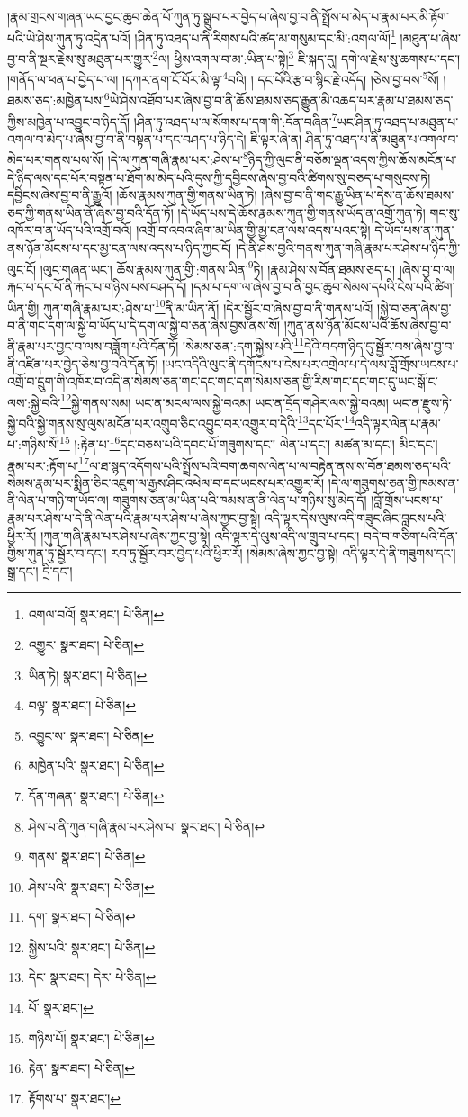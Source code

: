 །རྣམ་གྲངས་གཞན་ཡང་བྱང་ཆུབ་ཆེན་པོ་ཀུན་ཏུ་སྒྲུབ་པར་བྱེད་པ་ཞེས་བྱ་བ་ནི་སྤྲོས་པ་མེད་པ་རྣམ་པར་མི་རྟོག་པའི་ཡེ་ཤེས་ཀུན་ཏུ་འདྲེན་པའོ། །ཤིན་ཏུ་འཐད་པ་ནི་རིགས་པའི་ཚད་མ་གསུམ་དང་མི་:འགལ་ལོ།\footnote{འགལ་བའོ།  སྣར་ཐང་།  པེ་ཅིན། } །མཐུན་པ་ཞེས་བྱ་བ་ནི་སྔར་རྗེས་སུ་མཐུན་པར་གྱུར་\footnote{འགྱུར་  སྣར་ཐང་།  པེ་ཅིན། }ལ། ཕྱིས་འགལ་བ་མ་:ཡིན་པ་སྟེ།\footnote{ཡིན་ཏེ།  སྣར་ཐང་།  པེ་ཅིན། } ཇི་སྐད་དུ། དགེ་ལ་རྗེས་སུ་ཆགས་པ་དང་། །གནོད་ལ་ཕན་པ་བྱེད་པ་ལ། །དཀར་ནག་ངོ་བོར་མི་ལྟ་\footnote{བལྟ་  སྣར་ཐང་།  པེ་ཅིན། }བའི། །
དང་པོའི་རྩ་བ་སྙིང་རྗེ་འདོད། །ཅེས་བྱ་བས་\footnote{འབྱུང་ས་  སྣར་ཐང་།  པེ་ཅིན། }སོ། །ཐམས་ཅད་:མཁྱེན་པས་\footnote{མཁྱེན་པའི་  སྣར་ཐང་།  པེ་ཅིན། }ཡེ་ཤེས་འཐོབ་པར་ཞེས་བྱ་བ་ནི་ཆོས་ཐམས་ཅད་རྒྱུན་མི་འཆད་པར་རྣམ་པ་ཐམས་ཅད་ཀྱིས་མཁྱེན་པ་འབྱུང་བ་ཉིད་དོ། །ཤིན་ཏུ་འཐད་པ་ལ་སོགས་པ་དག་གི་:དོན་བཞིན་\footnote{དོན་གཞན་  སྣར་ཐང་།  པེ་ཅིན། }ཡང་ཤིན་ཏུ་འཐད་པ་མཐུན་པ་འགལ་བ་མེད་པ་ཞེས་བྱ་བ་ནི་བསྟན་པ་དང་བཤད་པ་ཉིད་དེ། ཇི་ལྟར་ཞེ་ན། ཤིན་ཏུ་འཐད་པ་ནི་མཐུན་པ་འགལ་བ་མེད་པར་གནས་པས་སོ། །དེ་ལ་ཀུན་གཞི་རྣམ་པར་:ཤེས་པ་\footnote{ཤེས་པ་ནི་ཀུན་གཞི་རྣམ་པར་ཤེས་པ་  སྣར་ཐང་།  པེ་ཅིན། }ཉིད་ཀྱི་ལུང་ནི་བཅོམ་ལྡན་འདས་ཀྱིས་ཆོས་མངོན་པ་དེ་ཉིད་ལས་དང་པོར་བསྟན་པ་ཐོག་མ་མེད་པའི་དུས་ཀྱི་དབྱིངས་ཞེས་བྱ་བའི་ཚིགས་སུ་བཅད་པ་གསུངས་ཏེ། དབྱིངས་ཞེས་བྱ་བ་ནི་རྒྱུའོ། །ཆོས་རྣམས་ཀུན་གྱི་གནས་ཡིན་ཏེ། །ཞེས་བྱ་བ་ནི་གང་རྒྱུ་ཡིན་པ་དེས་ན་ཆོས་ཐམས་ཅད་ཀྱི་གནས་ཡིན་ནོ་ཞེས་བྱ་བའི་དོན་ཏོ། །དེ་ཡོད་པས་དེ་ཆོས་རྣམས་ཀུན་གྱི་གནས་ཡོད་ན་འགྲོ་ཀུན་ཏེ། གང་སུ་འཁོར་བ་ན་ཡོད་པའི་འགྲོ་བའོ། །འགྲོ་བ་འབའ་ཞིག་མ་ཡིན་གྱི་མྱ་ངན་ལས་འདས་པའང་སྟེ། དེ་ཡོད་པས་ན་ཀུན་ནས་ཉོན་མོངས་པ་དང་མྱ་ངན་ལས་འདས་པ་ཉིད་ཀྱང་ངོ། །དེ་ནི་ཤེས་བྱའི་གནས་ཀུན་གཞི་རྣམ་པར་ཤེས་པ་ཉིད་ཀྱི་ལུང་ངོ། །ལུང་གཞན་ཡང་། ཆོས་རྣམས་ཀུན་གྱི་:གནས་ཡིན་\footnote{གནས་  སྣར་ཐང་།  པེ་ཅིན། }ཏེ། །རྣམ་ཤེས་ས་བོན་ཐམས་ཅད་པ། །ཞེས་བྱ་བ་ལ། རྐང་པ་དང་པོ་ནི་རྐང་པ་གཉིས་པས་བཤད་དོ། །དམ་པ་དག་ལ་ཞེས་བྱ་བ་ནི་བྱང་ཆུབ་སེམས་དཔའི་ངེས་པའི་ཚིག་ཡིན་གྱི། ཀུན་གཞི་རྣམ་པར་:ཤེས་པ་\footnote{ཤེས་པའི་  སྣར་ཐང་།  པེ་ཅིན། }ནི་མ་ཡིན་ནོ། །དེར་སྦྱོར་བ་ཞེས་བྱ་བ་ནི་གནས་པའོ། །སྐྱེ་བ་ཅན་ཞེས་བྱ་བ་ནི་གང་དག་ལ་སྐྱེ་བ་ཡོད་པ་དེ་དག་ལ་སྐྱེ་བ་ཅན་ཞེས་བྱས་ནས་སོ། །ཀུན་ནས་ཉོན་མོངས་པའི་ཆོས་ཞེས་བྱ་བ་ནི་རྣམ་པར་བྱང་བ་ལས་བཟློག་པའི་དོན་ཏོ། །སེམས་ཅན་:དག་སྐྱེས་པའི་\footnote{དག་  སྣར་ཐང་།  པེ་ཅིན། }དེའི་བདག་ཉིད་དུ་སྦྱོར་བས་ཞེས་བྱ་བ་ནི་འཛིན་པར་བྱེད་ཅེས་བྱ་བའི་དོན་ཏོ། །ཡང་འདིའི་ལུང་ནི་དགོངས་པ་ངེས་པར་འགྲེལ་པ་དེ་ལས་བློ་གྲོས་ཡངས་པ་འགྲོ་བ་དྲུག་གི་འཁོར་བ་འདི་ན་སེམས་ཅན་གང་དང་གང་དག་སེམས་ཅན་གྱི་རིས་གང་དང་གང་དུ་ཡང་སྒོ་ང་ལས་:སྐྱེ་བའི་\footnote{སྐྱེས་པའི་  སྣར་ཐང་།  པེ་ཅིན། }སྐྱེ་གནས་སམ། ཡང་ན་མངལ་ལས་སྐྱེ་བའམ། ཡང་ན་དྲོད་གཤེར་ལས་སྐྱེ་བའམ། ཡང་ན་རྫུས་ཏེ་སྐྱེ་བའི་སྐྱེ་གནས་སུ་ལུས་མངོན་པར་འགྲུབ་ཅིང་འབྱུང་བར་འགྱུར་བ་དེའི་\footnote{དེང་  སྣར་ཐང་། དེར་  པེ་ཅིན། }དང་པོར་\footnote{པོ་  སྣར་ཐང་། }འདི་ལྟར་ལེན་པ་རྣམ་པ་:གཉིས་སོ།\footnote{གཉིས་པོ།  སྣར་ཐང་།  པེ་ཅིན། } །:རྟེན་པ་\footnote{རྟེན་  སྣར་ཐང་།  པེ་ཅིན། }དང་བཅས་པའི་དབང་པོ་གཟུགས་དང་། ལེན་པ་དང་། མཚན་མ་དང་། མིང་དང་། རྣམ་པར་:རྟོག་པ་\footnote{རྟོགས་པ་  སྣར་ཐང་། }ལ་ཐ་སྙད་འདོགས་པའི་སྤྲོས་པའི་བག་ཆགས་ལེན་པ་ལ་བརྟེན་ནས་ས་བོན་ཐམས་ཅད་པའི་སེམས་རྣམ་པར་སྨིན་ཅིང་འཇུག་ལ་རྒྱས་ཤིང་འཕེལ་བ་དང་ཡངས་པར་འགྱུར་རོ། །དེ་ལ་གཟུགས་ཅན་གྱི་ཁམས་ན་ནི་ལེན་པ་གཉི་ག་ཡོད་ལ། གཟུགས་ཅན་མ་ཡིན་པའི་ཁམས་ན་ནི་ལེན་པ་གཉིས་སུ་མེད་དོ། །བློ་གྲོས་ཡངས་པ་རྣམ་པར་ཤེས་པ་དེ་ནི་ལེན་པའི་རྣམ་པར་ཤེས་པ་ཞེས་ཀྱང་བྱ་སྟེ། འདི་ལྟར་དེས་ལུས་འདི་གཟུང་ཞིང་བླངས་པའི་ཕྱིར་རོ། །ཀུན་གཞི་རྣམ་པར་ཤེས་པ་ཞེས་ཀྱང་བྱ་སྟེ། འདི་ལྟར་དེ་ལུས་འདི་ལ་གྲུབ་པ་དང་། བདེ་བ་གཅིག་པའི་དོན་གྱིས་ཀུན་ཏུ་སྦྱོར་བ་དང་། རབ་ཏུ་སྦྱོར་བར་བྱེད་པའི་ཕྱིར་རོ། །སེམས་ཞེས་ཀྱང་བྱ་སྟེ། འདི་ལྟར་དེ་ནི་གཟུགས་དང་། སྒྲ་དང་། དྲི་དང་། 